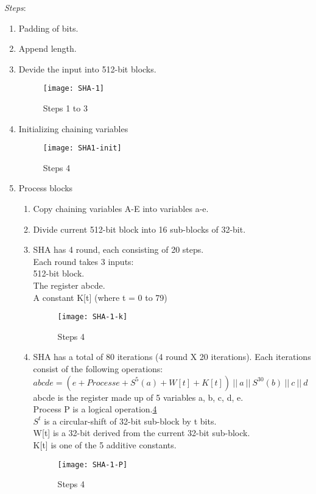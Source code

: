 \textit{Steps}:
\\
\begin{enumerate}
	\itemsep1em
	\item Padding of bits.
	\item Append length.
	\item Devide the input into 512-bit blocks.
		\begin{figure}[!h]
			\centering\texttt{[image: SHA-1]}
			\caption{Steps 1 to 3}
			\label{fig:SHA-1} 
		\end{figure}
	\item Initializing chaining variables
		\begin{figure}[!h]
			\centering\texttt{[image: SHA1-init]}
			\caption{Steps 4}
			\label{fig:SHA-1-init} 
		\end{figure}
	\item Process blocks
		\begin{enumerate}[label=\alph*.]
			\item Copy chaining variables A-E into variables a-e.
			\item Divide current 512-bit block into 16 sub-blocks of 32-bit.
			\item SHA has 4 round, each consisting of 20 steps.\\
				Each round takes 3 inputs:\\
				512-bit block.\\
				The register abcde.\\
				A constant K[t] (where t = 0 to 79)
				\begin{figure}[!h]
					\centering\texttt{[image: SHA-1-k]}
					\caption{Steps 4}
					\label{fig:SHA-1-k} 
				\end{figure}
				\item SHA has a total of 80 iterations (4 round X 20 iterations). Each iterations consist of the following operations:\\
				$abcde = (e + Process e + S^5(a) + W[t] + K[t])\ ||\ a\ ||\ S^{30}(b)\ ||\ c\ ||\ d$\\
					abcde is the register made up of 5 variables a, b, c, d, e.\\
					Process P is a logical operation.\ref{fig:SHA-1-P} \\
					$S^t$ is a circular-shift of 32-bit sub-block by t bits.\\
					W[t] is a 32-bit derived from the current 32-bit sub-block.\\
					K[t] is one of the 5 additive constants.
				\begin{figure}[!h]
					\centering\texttt{[image: SHA-1-P]}
					\caption{Steps 4}
					\label{fig:SHA-1-P} 
				\end{figure}
					
		\end{enumerate}
\end{enumerate}

